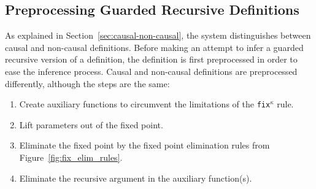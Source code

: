 




\subsection{Preprocessing Guarded Recursive Definitions}
\label{sec:impl-guard-recurs}
As explained in Section~\ref{sec:causal-non-causal}, the system distinguishes between
causal and non-causal definitions. Before making an attempt to infer a guarded
recursive version of a definition, the definition is first preprocessed in order
to ease the inference process. Causal and non-causal definitions are
preprocessed differently, although the steps are the same:

\begin{enumerate}
\item Create auxiliary functions to circumvent the limitations of the
  \texttt{fix$^\kappa$} rule.
\item Lift parameters out of the fixed point.
\item Eliminate the fixed point by the fixed point elimination rules from
  Figure~\ref{fig:fix_elim_rules}.
\item Eliminate the recursive argument in the auxiliary function(s).
\end{enumerate}

